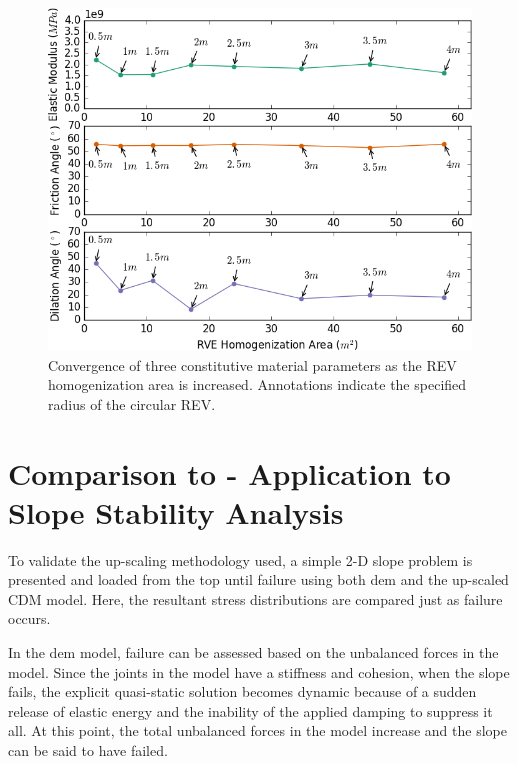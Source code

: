 \begin{figure}[!htb]
\begin{center}
\includegraphics[width=\textwidth]{figures/Chapter5/REVAnalysis}
\caption{{\label{fig:revconverge} Convergence of three constitutive material parameters as the REV homogenization area is increased. Annotations indicate the specified radius of the circular REV.%
}}
\end{center}
\end{figure}

\section{Comparison to  - Application to Slope Stability Analysis}

To validate the up-scaling methodology used, a simple 2-D slope problem is presented and loaded from the top until failure using both \acrshort{dem} and the up-scaled CDM model. Here, the resultant stress distributions are compared just as failure occurs. 

In the \acrshort{dem} model, failure can be assessed based on the unbalanced forces in the model. Since the joints in the model have a stiffness and cohesion, when the slope fails, the explicit quasi-static solution becomes dynamic because of a sudden release of elastic energy and the inability of the applied damping to suppress it all. At this point, the total unbalanced forces in the model increase and the slope can be said to have failed. 

